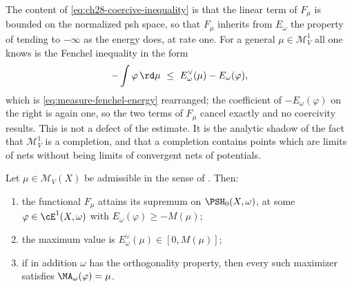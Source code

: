 \begin{remark}
\label{rem:ch28-coercivity-shape}
The content of \eqref{eq:ch28-coercive-inequality} is that the linear term
of \(F_\mu\) is bounded on the normalized psh space, so that \(F_\mu\)
inherits from \(E_\omega\) the property of tending to \(-\infty\) as the
energy does, at rate one.  For a general \(\mu\in\mathcal M^1_V\) all one
knows is the Fenchel inequality in the form
\[
 -\int\varphi\,\rd\mu\ \leq\ E^\vee_\omega(\mu)-E_\omega(\varphi),
\]
which is \eqref{eq:measure-fenchel-energy} rearranged; the coefficient of
\(-E_\omega(\varphi)\) on the right is again one, so the two terms of
\(F_\mu\) cancel exactly and no coercivity results.  This is not a defect of
the estimate.  It is the analytic shadow of the fact that
\(\mathcal M^1_V\) is a completion, and that a completion contains points
which are limits of nets without being limits of convergent nets of
potentials.
\end{remark}

\begin{theorem}
\label{thm:ch28-existence-admissible}
Let \(\mu\in\mathcal M_V(X)\) be admissible in the sense of
.  Then:
\begin{enumerate}
\item\label{itm:ch28-exist:max}
 the functional \(F_\mu\) attains its supremum on \(\PSH_0(X,\omega)\), at
 some \(\varphi\in\cE^1(X,\omega)\) with
 \(E_\omega(\varphi)\geq-M(\mu)\);
\item\label{itm:ch28-exist:value}
 the maximum value is \(E^\vee_\omega(\mu)\in[0,M(\mu)]\);
\item\label{itm:ch28-exist:equation}
 if in addition \(\omega\) has the orthogonality property, then every such
 maximizer satisfies \(\MA_\omega(\varphi)=\mu\).
\end{enumerate}
\end{theorem}

